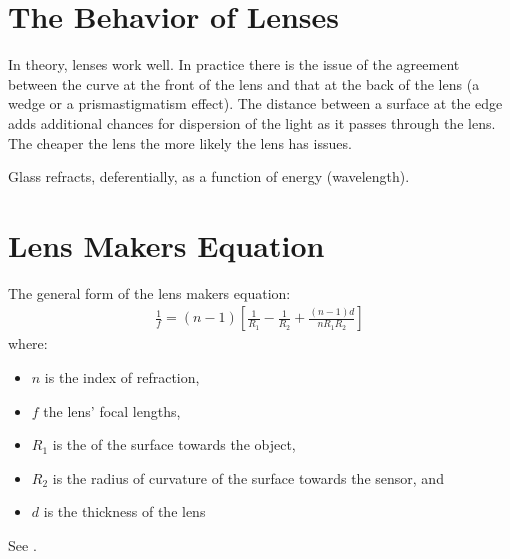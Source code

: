 \documentclass[letterpaper,10pt,english,openany,oneside]{sphinxmanual}
\begin{document}
\section{The Behavior of Lenses}
\label{\detokenize{physics:the-behavior-of-lenses}}
\sphinxAtStartPar
In theory, lenses work well. In practice there is the issue of the
agreement between the curve at the front of the lens and that at the
back of the lens (a wedge or a prism\sphinxhyphen{}astigmatism effect). The distance
between a surface at the edge adds additional chances for
dispersion of the light as it passes through the lens. The cheaper the
lens the more likely the lens has issues.

\sphinxAtStartPar
Glass refracts, deferentially, as a function of energy (wavelength).


\section{Lens Makers Equation}
\label{\detokenize{physics:lens-makers-equation}}
\sphinxAtStartPar
The general form of the lens makers equation:
\begin{equation*}
\begin{split}\frac{1}{f} = (n-1) \left[ \frac{1}{R_1} - \frac{1}{R_2} + \frac{(n-1)d}{n R_1 R_2} \right]\end{split}
\end{equation*}
\sphinxAtStartPar
where:
\begin{itemize}
\item {} 
\sphinxAtStartPar
\(n\)  is the index of refraction,

\item {} 
\sphinxAtStartPar
\(f\)   the lens’ focal lengths,

\item {} 
\sphinxAtStartPar
\(R_1\) is the  of the surface towards the object,

\item {} 
\sphinxAtStartPar
\(R_2\) is the radius of curvature of the surface towards the sensor, and

\item {} 
\sphinxAtStartPar
\(d\)   is the thickness of the lens

\end{itemize}

\sphinxAtStartPar
See .
\end{document}
